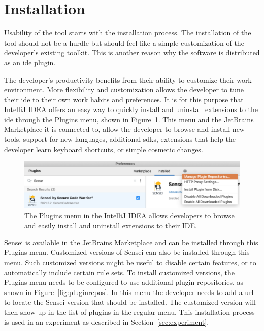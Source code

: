 \section{Installation}

Usability of the tool starts with the installation process.
The installation of the tool should not be a hurdle but should feel like a simple customization of the developer's existing toolkit.
This is another reason why the software is distributed as an \gls{ide} plugin.

The developer's productivity benefits from their ability to customize their work environment.
More flexibility and customization allows the developer to tune their \gls{ide} to their own work habits and preferences.
It is for this purpose that IntelliJ IDEA offers an easy way to quickly install and uninstall extensions to the \gls{ide} through the Plugins menu, shown in Figure~\ref{fig:pluginsmenu}.
This menu and the JetBrains Marketplace it is connected to, allow the developer to browse and install new tools, support for new languages, additional \glspl{sdk}, extensions that help the developer learn keyboard shortcuts, or simple cosmetic changes.

\begin{figure}
  \centering
  \includegraphics[width=\textwidth,page=2]{04-tools/figures/figures2.pdf}
  \caption[IntelliJ IDEA Plugins menu]{The Plugins menu in the IntelliJ IDEA allows developers to browse and easily install and uninstall extensions to their IDE.}
  \label{fig:pluginsmenu} 
\end{figure}

Sensei is available in the JetBrains Marketplace and can be installed through this Plugins menu.
Customized versions of Sensei can also be installed through this menu.
Such customized versions might be useful to disable certain features, or to automatically include certain rule sets.
To install customized versions, the Plugins menu needs to be configured to use additional plugin repositories, as shown in Figure~\ref{fig:pluginrepos}.
In this menu the developer needs to add a \gls{url} to locate the Sensei version that should be installed.
The customized version will then show up in the list of plugins in the regular menu.
This installation process is used in an experiment as described in Section~\ref{sec:experiment}.

